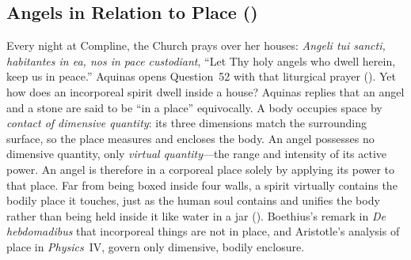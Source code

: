 
\subsection{Angels in Relation to Place ()}

Every night at Compline, the Church prays over her houses: \emph{Angeli tui sancti, habitantes in ea, nos in pace custodiant}, ``Let Thy holy angels who dwell herein, keep us in peace.'' Aquinas opens Question~52 with that liturgical prayer (). Yet how does an incorporeal spirit dwell inside a house? Aquinas replies that an angel and a stone are said to be ``in a place'' equivocally. A body occupies space by \emph{contact of dimensive quantity}: its three dimensions match the surrounding surface, so the place measures and encloses the body. An angel possesses no dimensive quantity, only \emph{virtual quantity}---the range and intensity of its active power. An angel is therefore in a corporeal place solely by applying its power to that place. Far from being boxed inside four walls, a spirit virtually contains the bodily place it touches, just as the human soul contains and unifies the body rather than being held inside it like water in a jar (). Boethius's remark in \emph{De hebdomadibus} that incorporeal things are not in place, and Aristotle's analysis of place in \emph{Physics}~IV, govern only dimensive, bodily enclosure.

